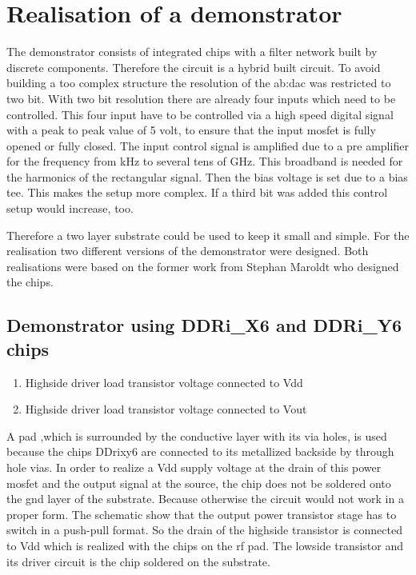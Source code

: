 \chapter{Realisation of a demonstrator}
The demonstrator consists of integrated chips with a filter network built by discrete components.
Therefore the circuit is a hybrid built circuit.
To avoid building a too complex structure the resolution of the \gls{ab:dac} was restricted to two bit.
With two bit resolution there are already four inputs which need to be controlled.
This four input have to be controlled via a high speed digital signal with a peak to peak value of 5 volt, to ensure that the input mosfet is fully opened or fully closed.
The input control signal is amplified due to a pre amplifier for the frequency from kHz to several tens of GHz.
This broadband is needed for the harmonics of the rectangular signal.
Then the bias voltage is set due to a bias tee.
This makes the setup more complex. 
If a third bit was added this control setup would increase, too.

Therefore a two layer substrate could be used to keep it small and simple.
For the realisation two different versions of the demonstrator were designed. 
Both realisations were based on the former work from Stephan Maroldt who designed the chips. 
\section{Demonstrator using DDRi\_X6 and DDRi\_Y6 chips}
\begin{enumerate}
	\item Highside driver load transistor voltage connected to Vdd
	\item Highside driver load transistor voltage connected to Vout
\end{enumerate}
A pad ,which is surrounded by the conductive layer with its via holes, is used because the chips DDrixy6 are connected to its metallized backside by through hole vias. In order to realize a Vdd supply voltage at the drain of this power mosfet and the output signal at the source, the chip does not be soldered onto the gnd layer of the substrate. 
Because otherwise the circuit would not work in a proper form.
The schematic show that the output power transistor stage has to switch in a push-pull format. So the drain of the highside transistor is connected to Vdd which is realized with the chips on the rf pad. The lowside transistor and its driver circuit is the chip soldered on the substrate.
